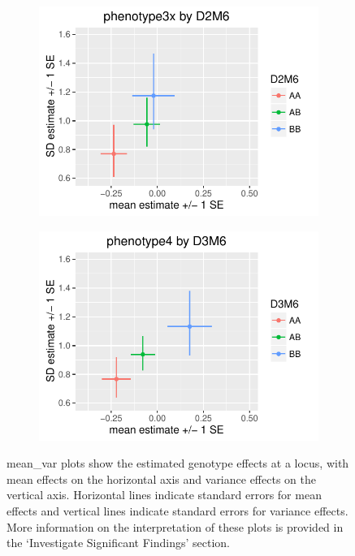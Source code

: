 \documentclass[9pt,twocolumn,twoside]{gsag3jnl}
\begin{document}
\begin{figure}[htbp]
    \begin{subfigure}[t]{0.24\textwidth}
        \includegraphics[width=\textwidth]{images/mean_var_plot_phen3x.pdf}
    \end{subfigure}  
    \hfill
    \begin{subfigure}[t]{0.24\textwidth}
        \includegraphics[width=\textwidth]{images/mean_var_plot_phen4x.pdf}
    \end{subfigure}
    
    \caption{mean\_var plots show the estimated genotype effects at a locus, with mean effects on the horizontal axis and variance effects on the vertical axis.  Horizontal lines indicate standard errors for mean effects and vertical lines indicate standard errors for variance effects.  More information on the interpretation of these plots is provided in the `Investigate Significant Findings' section. \label{fig:apdx_mean_var_plots}}
\end{figure}
\end{document}
